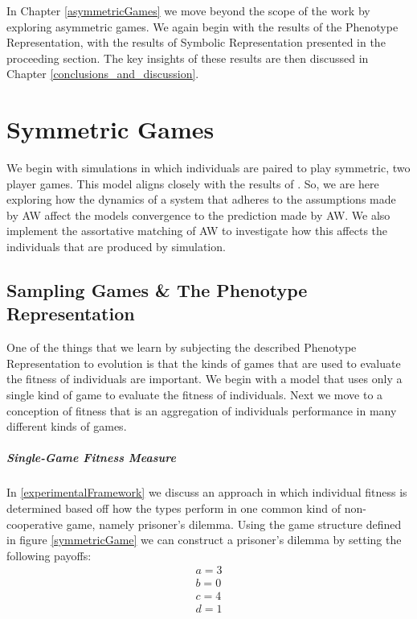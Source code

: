 \documentclass[11pt]{book}
\newcommand*{\np}{\par\noindent\newline}
\begin{document}
\np In Chapter \ref{asymmetricGames} we move beyond the scope of the \citeauthor{alger_generalization_2012} work by exploring asymmetric games.
We again begin with the results of the Phenotype Representation, with the results of Symbolic Representation presented in the proceeding section.
The key insights of these results are then discussed in Chapter \ref{conclusions_and_discussion}.


\chapter{Symmetric Games}\label{symmetricGames}

We begin with simulations in which individuals are paired to play symmetric, two player games.
This model aligns closely with the results of \citet{alger_generalization_2012}.
So, we are here exploring how the dynamics of a system that adheres to the assumptions made by AW affect the models convergence to the prediction made by AW.
We also implement the assortative matching of AW to investigate how this affects the individuals that are produced by simulation.

\section{Sampling Games \& The Phenotype Representation}

One of the things that we learn by subjecting the described Phenotype Representation to evolution is that the kinds of games that are used to evaluate the fitness of individuals are important.
We begin with a model that uses only a single kind of game to evaluate the fitness of individuals.
Next we move to a conception of fitness that is an aggregation of individuals performance in many different kinds of games.

\paragraph{Single-Game Fitness Measure}
\np In \ref{experimentalFramework} we discuss an approach in which individual fitness is determined based off how the types perform in one common kind of non-cooperative game, namely prisoner's dilemma.
Using the game structure defined in figure \ref{symmetricGame} we can construct a prisoner's dilemma by setting the following payoffs:
\begin{gather*}
	a = 3\\
	b = 0\\
	c = 4\\
	d = 1
\end{gather*}
\end{document}
